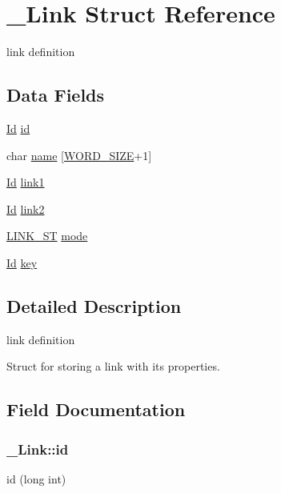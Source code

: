 \hypertarget{struct__Link}{}\section{\+\_\+\+Link Struct Reference}
\label{struct__Link}


link definition  


\subsection*{Data Fields}
\begin{DoxyCompactItemize}
\item 
\hyperlink{types_8h_a845e604fb28f7e3d97549da3448149d3}{Id} \hyperlink{struct__Link_a151212e7a8e8274c2a1ee991ba95878b}{id}
\item 
char \hyperlink{struct__Link_a020ee863120055b29609157b9de3c84d}{name} \mbox{[}\hyperlink{types_8h_a92ed8507d1cd2331ad09275c5c4c1c89}{W\+O\+R\+D\+\_\+\+S\+I\+ZE}+1\mbox{]}
\item 
\hyperlink{types_8h_a845e604fb28f7e3d97549da3448149d3}{Id} \hyperlink{struct__Link_a5e7fbb3e1b15bf0cf981153c08be0729}{link1}
\item 
\hyperlink{types_8h_a845e604fb28f7e3d97549da3448149d3}{Id} \hyperlink{struct__Link_a7ea0ebc1c732428f2cc7e66b6b8832e4}{link2}
\item 
\hyperlink{types_8h_a3425906c2a1ce4f324e3b2006ece02cd}{L\+I\+N\+K\+\_\+\+ST} \hyperlink{struct__Link_a48f4cacf668ee2063e79d927bf50578a}{mode}
\item 
\hyperlink{types_8h_a845e604fb28f7e3d97549da3448149d3}{Id} \hyperlink{struct__Link_a51a17371bac3cb3d09e011a95da238b6}{key}
\end{DoxyCompactItemize}


\subsection{Detailed Description}
link definition 

Struct for storing a link with its properties. 

\subsection{Field Documentation}
\subsubsection[{\texorpdfstring{id}{id}}]{ \+\_\+\+Link\+::id}\hypertarget{struct__Link_a151212e7a8e8274c2a1ee991ba95878b}{}\label{struct__Link_a151212e7a8e8274c2a1ee991ba95878b}
id (long int) 
